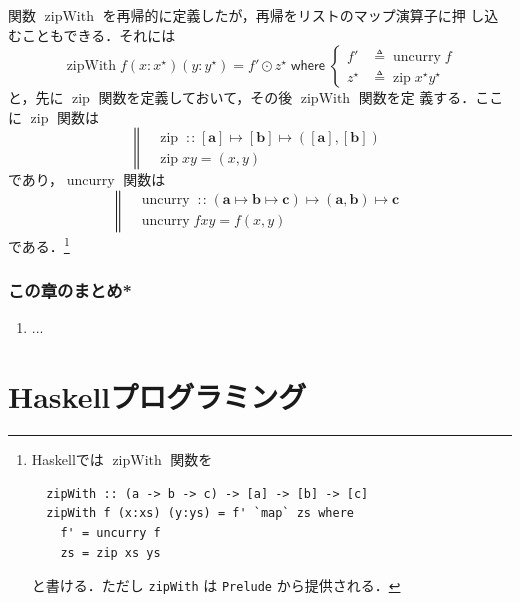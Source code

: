 \documentclass[a5paper,twoside,fleqn,draft]{jsbook}
\newcommand{\programminglanguage}[1]{\textsf{#1}}
\newcommand{\haskell}{\programminglanguage{Haskell}}
\newcommand{\code}[1]{\texttt{#1}}
\newcommand{\filename}[1]{\texttt{#1}}
\newcommand{\mBrace}{\Vert}
\newcommand{\mKeyword}[1]{\mathsf{#1}}
\newcommand{\mWhereKeyword}{\mKeyword{where}}
\DeclareMathOperator{\mWhere}{\mWhereKeyword}
\newcommand{\mSpecialFunc}[1]{#1}
\DeclareMathOperator{\mUncurry}{\mSpecialFunc{uncurry}}
\DeclareMathOperator{\mZipFunc}{\mSpecialFunc{zip}}
\DeclareMathOperator{\mZipWith}{\mSpecialFunc{zipWith}}
\DeclareMathOperator{\mFuncArrow}{\mapsto}
\DeclareMathOperator{\mIn}{{:\!:}}
\DeclareMathOperator{\mLetEq}{\triangleq}
\DeclareMathOperator{\mMapList}{\odot}
\newcommand{\mType}[1]{\mathbf{#1}} %
\newcommand{\mA}{\mType{a}}
\newcommand{\mB}{\mType{b}}
\newcommand{\mC}{\mType{c}}
\newcommand{\mList}[1]{{#1}^\mathrm{\star}}
\newcommand{\mProjEXP}[2]{#1\mFuncArrow#2} %
\begin{document}
関数 $\mZipWith$ を再帰的に定義したが，再帰をリストのマップ演算子に押
し込むこともできる．それには
\begin{equation}
  \mZipWith f(x:\mList{x})(y:\mList{y})
  =f'\mMapList\mList{z}
  \mWhere
  \left\{
  \begin{aligned}
    f'
    &\mLetEq\mUncurry f\\
    \mList{z}
    &\mLetEq\mZipFunc\mList{x}\mList{y}
  \end{aligned}
  \right.
\end{equation}
と，先に $\mZipFunc$ 関数を定義しておいて，その後 $\mZipWith$ 関数を定
義する．ここに $\mZipFunc$ 関数は
\begin{equation}
  \left\mBrace
  \begin{aligned}
    {}&\mZipFunc\mIn{}\mProjEXP{[\mA]}
    {\mProjEXP{[\mB]}
      {([\mA],[\mB])}}\\
    {}&\mZipFunc xy=(x,y)
  \end{aligned}
  \right.
\end{equation}
であり，$\mUncurry$ 関数は
\begin{equation}
  \left\mBrace
  \begin{aligned}
    {}&\mUncurry\mIn{}
    \mProjEXP{(\mProjEXP{\mA }{\mProjEXP{\mB }{\mC }})}
          {\mProjEXP{(\mA ,\mB )}{\mC }}\\
          {}&\mUncurry fxy=f(x,y)
  \end{aligned}
  \right.
\end{equation}
である．\footnote{\haskell では $\mZipWith$ 関数を
\begin{verbatim}
  zipWith :: (a -> b -> c) -> [a] -> [b] -> [c]
  zipWith f (x:xs) (y:ys) = f' `map` zs where
    f' = uncurry f
    zs = zip xs ys
\end{verbatim}
と書ける．ただし \code{zipWith} は \filename{Prelude} から提供される．}


\section{この章のまとめ*}

\begin{enumerate}
\item ...
\end{enumerate}

\part{\haskell プログラミング}
\end{document}

